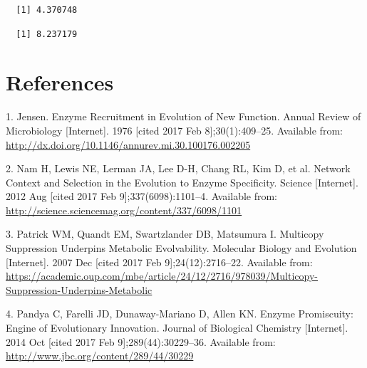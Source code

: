 \documentclass[12pt,twoside]{reedthesis}
\begin{document}
  \begin{verbatim}
  [1] 4.370748
  \end{verbatim}
  
  \begin{Shaded}
  \begin{Highlighting}[]
  \NormalTok{(}
  \end{Highlighting}
  \end{Shaded}
  
  \begin{verbatim}
  [1] 8.237179
  \end{verbatim}
  
  \backmatter
  
  \chapter{References}\label{references}
  
  \noindent
  
  \setlength{\parindent}{-0.20in} \setlength{\leftskip}{0.20in}
  \setlength{\parskip}{8pt}
  
  \hypertarget{refs}{}
  \hypertarget{ref-jensen_enzyme_1976}{}
  1. Jensen. Enzyme Recruitment in Evolution of New Function. Annual
  Review of Microbiology {[}Internet{]}. 1976 {[}cited 2017 Feb
  8{]};30(1):409--25. Available from:
  \url{http://dx.doi.org/10.1146/annurev.mi.30.100176.002205}
  
  \hypertarget{ref-nam_network_2012}{}
  2. Nam H, Lewis NE, Lerman JA, Lee D-H, Chang RL, Kim D, et al. Network
  Context and Selection in the Evolution to Enzyme Specificity. Science
  {[}Internet{]}. 2012 Aug {[}cited 2017 Feb 9{]};337(6098):1101--4.
  Available from:
  \url{http://science.sciencemag.org/content/337/6098/1101}
  
  \hypertarget{ref-patrick_multicopy_2007}{}
  3. Patrick WM, Quandt EM, Swartzlander DB, Matsumura I. Multicopy
  Suppression Underpins Metabolic Evolvability. Molecular Biology and
  Evolution {[}Internet{]}. 2007 Dec {[}cited 2017 Feb
  9{]};24(12):2716--22. Available from:
  \url{https://academic.oup.com/mbe/article/24/12/2716/978039/Multicopy-Suppression-Underpins-Metabolic}
  
  \hypertarget{ref-pandya_enzyme_2014}{}
  4. Pandya C, Farelli JD, Dunaway-Mariano D, Allen KN. Enzyme
  Promiscuity: Engine of Evolutionary Innovation. Journal of Biological
  Chemistry {[}Internet{]}. 2014 Oct {[}cited 2017 Feb
  9{]};289(44):30229--36. Available from:
  \url{http://www.jbc.org/content/289/44/30229}
  
\end{document}
